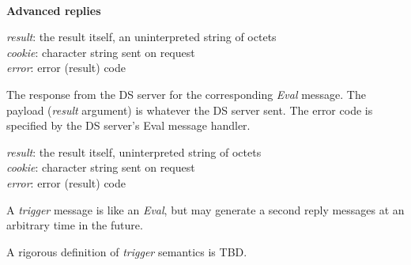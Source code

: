 \paragraph {}
{\bf Advanced replies}

{
\metP
    {\em result}: the result itself, an uninterpreted string of octets\\
    {\em cookie}: character string sent on request\\
    {\em error}: error (result) code
    
\metD
    The response from the DS server for the corresponding {\em
    Eval} message. The payload ({\em result} argument) is whatever the
    DS server sent. The error code is specified by the DS 
    server's Eval message handler.  }

{
\metP
    {\em result}: the result itself, uninterpreted string of octets\\
    {\em cookie}: character string sent on request\\
    {\em error}: error (result) code
    
\metD
    A {\em trigger} message is like an {\em Eval}, but may generate
    a second reply messages at an arbitrary time in the future.

    A rigorous definition of {\em trigger} semantics is TBD.
}

